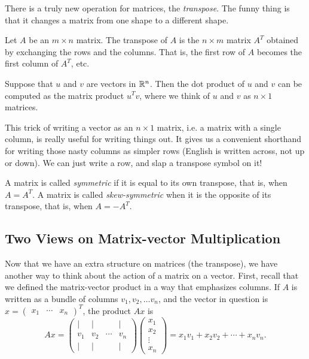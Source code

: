 \documentclass[elementsmain.tex]{subfiles}
\begin{document}
There is a truly new operation for matrices, the \emph{transpose}. The funny thing is that it changes a matrix from one shape to a different shape.

\begin{definition} Let $A$ be an $m\times n$ matrix. The transpose of $A$ is the $n\times m$ matrix $A^T$ obtained by exchanging the rows and the columns. That is, the first row of $A$ becomes the first column of $A^T$, etc.
\end{definition}

\begin{theorem}\label{thm:dot-prod-transpose}
Suppose that $u$ and $v$ are vectors in $\mathbb{R}^n$. Then the dot product of $u$ and $v$ can be computed as the matrix product $u^Tv$, where we think of $u$ and $v$ as $n\times 1$ matrices.
\end{theorem}

\begin{remark} This trick of writing a vector as an $n\times 1$ matrix, i.e. a matrix with a single column, is really useful for writing things out. It gives us a convenient shorthand for writing those nasty columns as simpler rows (English is written across, not up or down). We can just write a row, and slap a transpose symbol on it!
\end{remark}


\begin{definition} A matrix is called \emph{symmetric} if it is equal to its own transpose, that is, when $A = A^T$. A matrix is called \emph{skew-symmetric} when it is the opposite of its transpose, that is, when $A = - A^T$.
\end{definition}

\subsection*{Two Views on Matrix-vector Multiplication}

Now that we have an extra structure on matrices (the transpose), we have another way to think about the action of a matrix on a vector. First, recall that we defined the matrix-vector product in a way that emphasizes columns. If $A$ is written as a bundle of columns $v_1, v_2, \dots v_n$, and the vector in question is $x = \begin{pmatrix} x_1 & \cdots & x_n\end{pmatrix}^T$, the product $Ax$ is
\[
Ax = \begin{pmatrix} | & | &  & | \\ v_1 & v_2 & \cdots & v_n \\ | & | &  & |\end{pmatrix}
\begin{pmatrix} x_1 \\ x_2 \\ \vdots \\ x_n \end{pmatrix} 
= x_1 v_1 + x_2 v_2 + \cdots + x_n v_n.
\]
\end{document}
